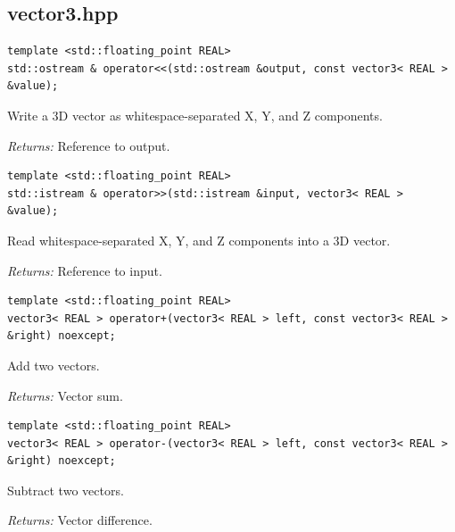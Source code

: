 \subsection{vector3.hpp}
\par\noindent\begin{minipage}{\linewidth}
\begin{lstlisting}[style=apireference]
template <std::floating_point REAL>
std::ostream & operator<<(std::ostream &output, const vector3< REAL > &value);
\end{lstlisting}
{\footnotesize Write a 3D vector as whitespace-separated X, Y, and Z components.\par}
{\footnotesize\textit{Returns:} Reference to output.\par}
\end{minipage}\par\vspace{1pt}
\par\noindent\begin{minipage}{\linewidth}
\begin{lstlisting}[style=apireference]
template <std::floating_point REAL>
std::istream & operator>>(std::istream &input, vector3< REAL > &value);
\end{lstlisting}
{\footnotesize Read whitespace-separated X, Y, and Z components into a 3D vector.\par}
{\footnotesize\textit{Returns:} Reference to input.\par}
\end{minipage}\par\vspace{1pt}
\par\noindent\begin{minipage}{\linewidth}
\begin{lstlisting}[style=apireference]
template <std::floating_point REAL>
vector3< REAL > operator+(vector3< REAL > left, const vector3< REAL > &right) noexcept;
\end{lstlisting}
{\footnotesize Add two vectors.\par}
{\footnotesize\textit{Returns:} Vector sum.\par}
\end{minipage}\par\vspace{1pt}
\par\noindent\begin{minipage}{\linewidth}
\begin{lstlisting}[style=apireference]
template <std::floating_point REAL>
vector3< REAL > operator-(vector3< REAL > left, const vector3< REAL > &right) noexcept;
\end{lstlisting}
{\footnotesize Subtract two vectors.\par}
{\footnotesize\textit{Returns:} Vector difference.\par}
\end{minipage}\par\vspace{1pt}
